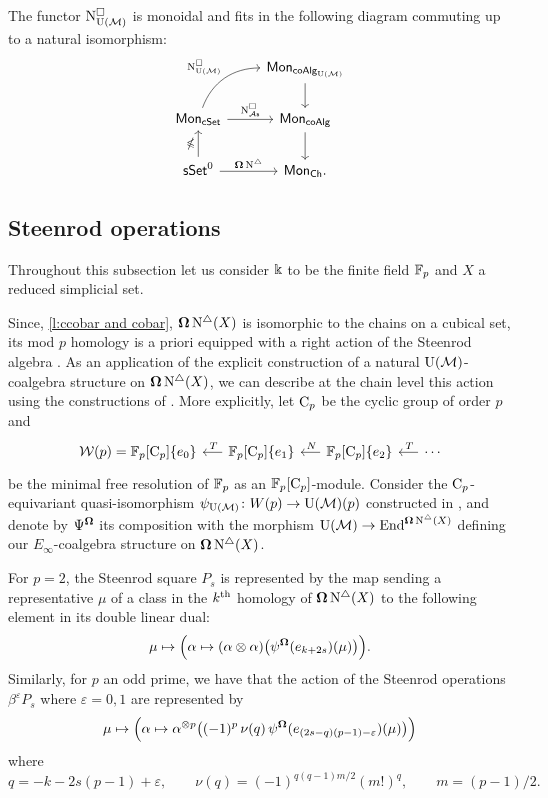 \begin{lemma} \label{l:lift of cobar to e-infty}
	The functor $\operatorname{N^{\square}_{{\operatorname{U}(\mathcal{M})}}}$ is monoidal and fits in the following diagram commuting up to a natural isomorphism:
	\[
	\begin{tikzcd}
	& \Mon_{\coAlg_\UM} \arrow[d] \\
	\Mon_{\cSet} \arrow[ru, "\cchainsUM", out=70, in=180] \arrow[r, "\cchainsAs"]
	& \Mon_{\coAlg} \arrow[d] \\
	\sSet^0 \arrow[r, "\cobar \schains"] \arrow[u, "\ccobar"]
	& \Mon_{\Ch}.
	\end{tikzcd}
	\]
\end{lemma}

\subsection{Steenrod operations}

Throughout this subsection let us consider $\Bbbk$ to be the finite field ${\mathbb{F}_p}$ and $X$ a reduced simplicial set.

Since, \cref{l:ccobar and cobar}, $\operatorname{\mathbf{\Omega}} \operatorname{N^{\triangle}}(X)$ is isomorphic to the chains on a cubical set, its mod $p$ homology is a priori equipped with a right action of the Steenrod algebra \cite{steenrod1962cohomology, milnor1958steenrod}.
As an application of the explicit construction of a natural ${\operatorname{U}(\mathcal{M})}$-coalgebra structure on $\operatorname{\mathbf{\Omega}} \operatorname{N^{\triangle}}(X)$, we can describe at the chain level this action using the constructions of \cite{medina2020maysteenrod}.
More explicitly, let ${\mathrm{C}_p}$ be the cyclic group of order $p$ and
\[
\begin{tikzcd} [column sep = .5cm]
\mathcal W(p) = \Fp[\Cp]\{e_0\} & \arrow[l, "\,T"'] \Fp[\Cp]\{e_1\} & \arrow[l, "\,N"'] \Fp[\Cp]\{e_2\} & \arrow[l, "\,T"'] \dotsb
\end{tikzcd}
\]
be the minimal free resolution of ${\mathbb{F}_p}$ as an ${\mathbb{F}_p}[{\mathrm{C}_p}]$-module.
Consider the ${\mathrm{C}_p}$-equivariant quasi-isomorphism $\psi_{\operatorname{U}(\mathcal{M})} \colon W(p) \to {\operatorname{U}(\mathcal{M})}(p)$ constructed in \cite{medina2020maysteenrod}, and denote by $\Psi^{\operatorname{\mathbf{\Omega}}}$ its composition with the morphism ${\operatorname{U}(\mathcal{M})} \to \mathrm{End}^{\operatorname{\mathbf{\Omega}} \operatorname{N^{\triangle}}(X)}$ defining our $E_\infty$-coalgebra structure on $\operatorname{\mathbf{\Omega}} \operatorname{N^{\triangle}}(X)$.

For $p = 2$, the Steenrod square $P_s$ is represented by the map sending a representative $\mu$ of a class in the $k^\mathrm{th}$ homology of $\operatorname{\mathbf{\Omega}} \operatorname{N^{\triangle}}(X)$ to the following element in its double linear dual:
\[
\mu \mapsto
\Big( \alpha \mapsto (\alpha \otimes \alpha) \big( \psi^{\operatorname{\mathbf{\Omega}}}(e_{k+2s})(\mu) \big) \Big).
\]
Similarly, for $p$ an odd prime, we have that the action of the Steenrod operations $\beta^\varepsilon P_{s}$ where $\varepsilon = 0,1$ are represented by
\[
\mu \mapsto
\Big( \alpha \mapsto \alpha^{\otimes p} \big( (-1)^p \, \nu(q) \, \psi^{\operatorname{\mathbf{\Omega}}}(e_{(2s-q)(p-1)-\varepsilon})(\mu) \big) \Big)
\]
where
\[
q = -k -2s(p-1)+\varepsilon, \qquad
\nu(q) = (-1)^{q(q-1)m/2}(m!)^q, \qquad
m = (p-1)/2.
\]

